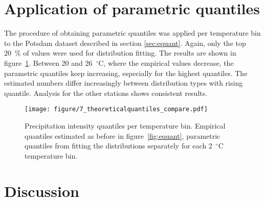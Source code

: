 \documentclass[a4paper]{article}
\newcommand{\todo}[1]{\emph{\textcolor{red}{#1}}}
\begin{document}
\section{Application of parametric quantiles} %
\label{sec:paramquant}
\begin{multicols}{2}

The procedure of obtaining parametric quantiles was applied per temperature bin to the Potsdam dataset described in section \ref{sec:equant}.
Again, only the top 20~\% of values were used for distribution fitting.
The results are shown in figure~\ref{fig:tquant}.
Between 20 and 26~$^\circ$C, where the empirical values decrease, the parametric quantiles keep increasing, especially for the highest quantiles.
The estimated numbers differ increasingly between distribution types with rising quantile. 
Analysis for the other stations shows consistent results.



\end{multicols}
\begin{figure}[H] %
\texttt{[image: figure/7\_theoreticalquantiles\_compare.pdf]}
\caption[Parametric quantiles]{Precipitation intensity quantiles per temperature bin. Empirical quantiles estimated as before in figure~\ref{fig:equant}, parametric quantiles from fitting the distributions separately for each 2~$^\circ$C temperature bin.}
\label{fig:tquant}
\end{figure}




\pagebreak
\section{Discussion} %
\label{sec:discussion}
\end{document}
